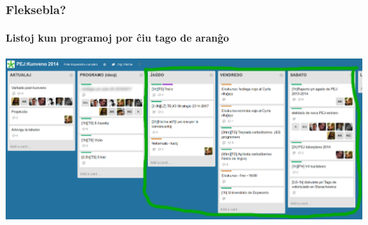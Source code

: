   \begin{frame}
    \frametitle{Fleksebla?}
    \framesubtitle{Listoj kun programoj por ĉiu tago de aranĝo}
    
    \includegraphics[scale=0.21]{ekranoj/programo-listoj}
  \end{frame}
